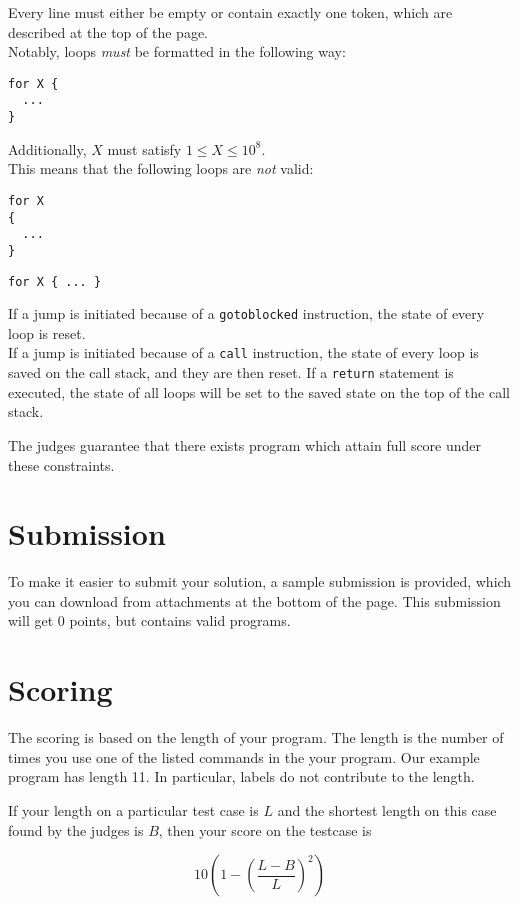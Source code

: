Every line must either be empty or contain exactly one token, which are described at the top of the page. \\
Notably, loops \textit{must} be formatted in the following way:
\begin{verbatim}
for X {
  ...
}
\end{verbatim}
Additionally, $X$ must satisfy $1 \leq X \leq 10^8$.\\
This means that the following loops are \textit{not} valid:
\begin{verbatim}
for X
{
  ...
}
\end{verbatim}
\begin{verbatim}
for X { ... }
\end{verbatim}


If a jump is initiated because of a \texttt{gotoblocked} instruction, the state of every loop is reset. \\
If a jump is initiated because of a \texttt{call} instruction, the state of every loop is saved on the call stack, and they are then reset.
If a \texttt{return} statement is executed, the state of all loops will be set to the saved state on the top of the call stack.


The judges guarantee that there exists program which attain full score under these constraints.

\section*{Submission}
To make it easier to submit your solution, a sample submission is provided, which you can download from attachments at the bottom of the page.
This submission will get 0 points, but contains valid programs.

\section*{Scoring}
The scoring is based on the length of your program. The length is the number of times you use one
of the listed commands in the your program. Our example program has length 11. In particular, labels
do not contribute to the length.

If your length on a particular test case is $L$ and the shortest length on this case found by the
judges is $B$, then your score on the testcase is

\[ 10 (1 - (\frac{L - B}{L})^2)\]
